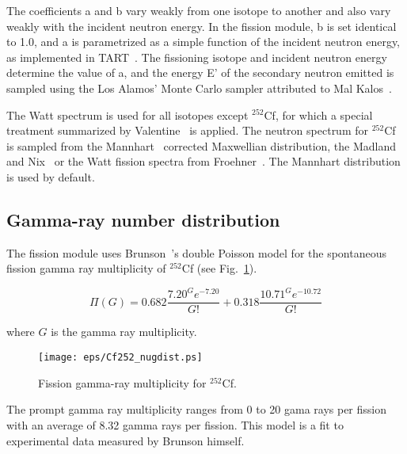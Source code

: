 \documentclass[11pt]{article}
\newcommand{\notgeant}[1]{}%
\begin{document}
The coefficients a and b vary weakly from one isotope to another and
also vary weakly with the incident neutron energy.  In the fission
module, b is set identical to 1.0, and a is parametrized as a simple
function of the incident neutron energy, as implemented in
TART~\cite{TART 2003, Cullen 2004}.  The fissioning isotope and
incident neutron energy determine the value of a, and the energy E' of
the secondary neutron emitted is sampled using the Los Alamos' Monte
Carlo sampler attributed to Mal Kalos~\cite{Everett 1983}.

The Watt spectrum is used for all isotopes except $^{252}$Cf, for which a
special treatment summarized by Valentine~\cite{Valentine 2000} is
applied.  The neutron spectrum for $^{252}$Cf is sampled from
the Mannhart~\cite{Mannhart 1987} corrected Maxwellian distribution, 
the Madland and Nix~\cite{Madland 1984}
or the Watt fission spectra from
Froehner~\cite{Froehner 1990}. 
\notgeant{These options are selected by the internal variable {\tt neng=0(default),1,2} respectively.} The Mannhart distribution is used by default.


\subsection{Gamma-ray number distribution}

The fission module uses Brunson~\cite{Brunson 1982}'s double Poisson
model for the spontaneous fission gamma ray multiplicity of $^{252}$Cf
(see Fig.~\ref{Fission gamma-ray multiplicity for 252Cf}).

\begin{equation}
\Pi(G)=0.682\frac{7.20^Ge^{-7.20}}{G!}+0.318\frac{10.71^Ge^{-10.72}}{G!}
\end{equation}

where $G$ is the gamma ray multiplicity.
\begin{figure}[ht]
\begin{center}
\texttt{[image: eps/Cf252\_nugdist.ps]}
\end{center}
\caption{Fission gamma-ray multiplicity for $^{252}$Cf.}
\label{Fission gamma-ray multiplicity for 252Cf}
\end{figure}

The prompt gamma ray multiplicity ranges from 0 to 20 gama rays per
fission with an average of 8.32 gamma rays per fission.  This model is
a fit to experimental data measured by Brunson himself.
\end{document}
